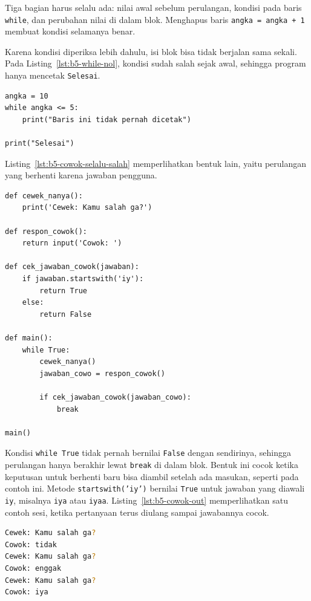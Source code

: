 Tiga bagian harus selalu ada: nilai awal sebelum perulangan, kondisi pada baris \texttt{while}, dan perubahan nilai di dalam blok. Menghapus baris \texttt{angka = angka + 1} membuat kondisi selamanya benar.

Karena kondisi diperiksa lebih dahulu, isi blok bisa tidak berjalan sama sekali. Pada Listing~\ref{lst:b5-while-nol}, kondisi sudah salah sejak awal, sehingga program hanya mencetak \texttt{Selesai}.

\begin{lstlisting}[style=PythonStyle, caption={Kode Python: while_tidak_berjalan.py}, label={lst:b5-while-nol}]
angka = 10
while angka <= 5:
    print("Baris ini tidak pernah dicetak")

print("Selesai")
\end{lstlisting}

Listing~\ref{lst:b5-cowok-selalu-salah} memperlihatkan bentuk lain, yaitu perulangan yang berhenti karena jawaban pengguna.


\begin{lstlisting}[style=PythonStyle, caption={Kode Python: cowok_selalu_salah.py}, label={lst:b5-cowok-selalu-salah}]
def cewek_nanya():
    print('Cewek: Kamu salah ga?')

def respon_cowok():
    return input('Cowok: ')

def cek_jawaban_cowok(jawaban):
    if jawaban.startswith('iy'):
        return True
    else:
        return False
    
def main():
    while True:
        cewek_nanya()
        jawaban_cowo = respon_cowok()

        if cek_jawaban_cowok(jawaban_cowo):
            break

main()
\end{lstlisting}

Kondisi \texttt{while True} tidak pernah bernilai \texttt{False} dengan sendirinya, sehingga perulangan hanya berakhir lewat \texttt{break} di dalam blok. Bentuk ini cocok ketika keputusan untuk berhenti baru bisa diambil setelah ada masukan, seperti pada contoh ini. Metode \texttt{startswith('iy')} bernilai \texttt{True} untuk jawaban yang diawali \texttt{iy}, misalnya \texttt{iya} atau \texttt{iyaa}. Listing~\ref{lst:b5-cowok-out} memperlihatkan satu contoh sesi, ketika pertanyaan terus diulang sampai jawabannya cocok.

\begin{lstlisting}[language=bash, caption={Contoh sesi cowok_selalu_salah.py}, label={lst:b5-cowok-out}]
Cewek: Kamu salah ga?
Cowok: tidak
Cewek: Kamu salah ga?
Cowok: enggak
Cewek: Kamu salah ga?
Cowok: iya
\end{lstlisting}

